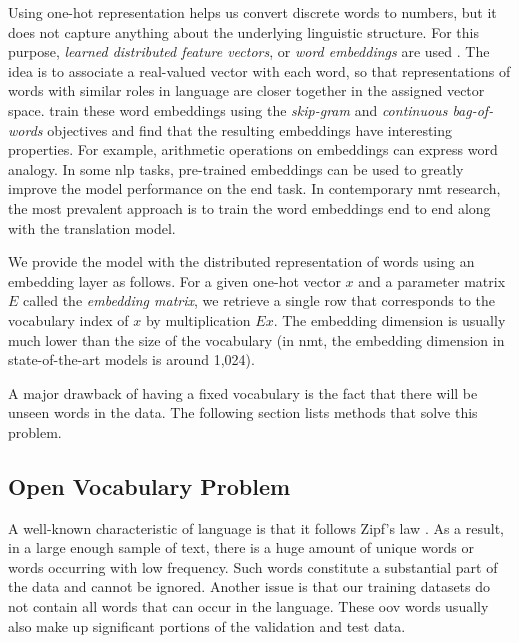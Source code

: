 Using one-hot representation helps us convert discrete words to numbers, but it
does not capture anything about the underlying linguistic structure.  For this
purpose, \emph{learned distributed feature vectors}, or \emph{word embeddings}
are used \citep{bengio2003neural, collobert-weston-2007-fast}. The idea is to
associate a real-valued vector with each word, so that representations of words
with similar roles in language are closer together in the assigned vector
space. \citet{mikolov-etal-2013-distributed} train these word embeddings using
the \emph{skip-gram} and \emph{continuous bag-of-words} objectives and find
that the resulting embeddings have interesting properties. For example,
arithmetic operations on embeddings can express word analogy.  In some \ac{nlp}
tasks, pre-trained embeddings can be used to greatly improve the model
performance on the end task. In contemporary \ac{nmt} research, the most
prevalent approach is to train the word embeddings end to end along with the
translation model.

We provide the model with the distributed representation of words using an
embedding layer as follows. For a given one-hot vector $x$ and a parameter
matrix $E$ called the \emph{embedding matrix}, we retrieve a single row that
corresponds to the vocabulary index of $x$ by multiplication $E x$.  The
embedding dimension is usually much lower than the size of the vocabulary (in
\ac{nmt}, the embedding dimension in state-of-the-art models is around 1,024).

A major drawback of having a fixed vocabulary is the fact that there will be
unseen words in the data. The following section lists methods that solve this
problem.


\subsection{Open Vocabulary Problem}
\label{subsec:openvoc}

A well-known characteristic of language is that it follows Zipf's law
\citep{zipf1949human}. As a result, in a large enough sample of text, there is
a huge amount of unique words or words occurring with low frequency. Such words
constitute a substantial part of the data and cannot be ignored.  Another issue
is that our training datasets do not contain all words that can occur in the
language. These \ac{oov} words usually also make up significant portions of the
validation and test data.

